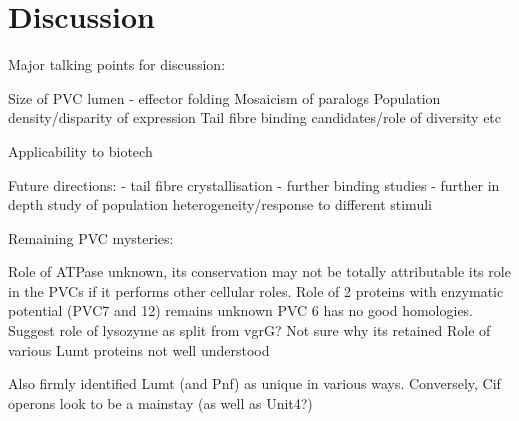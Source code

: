\pagestyle{IHA-fancy-style}


\chapter{Discussion}\label{Discussion}

Major talking points for discussion:

Size of PVC lumen - effector folding
Mosaicism of paralogs
Population density/disparity of expression
Tail fibre binding candidates/role of diversity etc

Applicability to biotech


Future directions:
	- tail fibre crystallisation
	- further binding studies
	- further in depth study of population heterogeneity/response to different stimuli
	

Remaining PVC mysteries:

Role of ATPase unknown, its conservation may not be totally attributable its role in the PVCs if it performs other cellular roles.
Role of 2 proteins with enzymatic potential (PVC7 and 12) remains unknown
PVC 6 has no good homologies.
Suggest role of lysozyme as split from vgrG? Not sure why its retained
Role of various Lumt proteins not well understood

Also firmly identified Lumt (and Pnf) as unique in various ways. Conversely, Cif operons look to be a mainstay (as well as Unit4?)